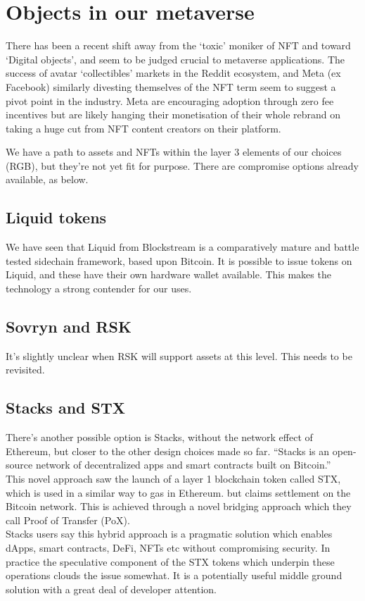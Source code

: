 \section{Objects in our metaverse}
There has been a recent shift away from the `toxic' moniker of NFT and toward `Digital objects', and seem to be judged crucial to metaverse applications. The success of avatar `collectibles' markets in the Reddit ecosystem, and Meta (ex Facebook) similarly divesting themselves of the NFT term seem to suggest a pivot point in the industry. Meta are encouraging adoption through zero fee incentives but are likely hanging their monetisation of their whole rebrand on taking a huge cut from NFT content creators on their platform.\par
We have a path to assets and NFTs within the layer 3 elements of our choices (RGB), but they're not yet fit for purpose. There are compromise options already available, as below. 
\subsection{Liquid tokens}
We have seen that Liquid from Blockstream is a comparatively mature and battle tested sidechain framework, based upon Bitcoin. It is possible to issue tokens on Liquid, and these have their own hardware wallet available. This makes the technology a strong contender for our uses.
\subsection{Sovryn and RSK}
It's slightly unclear when RSK will support assets at this level. This needs to be revisited.
\subsection{Stacks and STX}
There's another possible option is Stacks, without the network effect of Ethereum, but closer to the other design choices made so far. ``Stacks is an open-source network of decentralized apps and smart contracts built on Bitcoin.''\\ 
This novel approach saw the launch of a layer 1 blockchain token called STX, which is used in a similar way to gas in Ethereum. but claims settlement on the Bitcoin network. This is achieved through a novel bridging approach which they call Proof of Transfer (PoX).\\
Stacks users say this hybrid approach is a pragmatic solution which enables dApps, smart contracts, DeFi, NFTs etc without compromising security. In practice the speculative component of the STX tokens which underpin these operations clouds the issue somewhat. It is a potentially useful middle ground solution with a great deal of developer attention.
